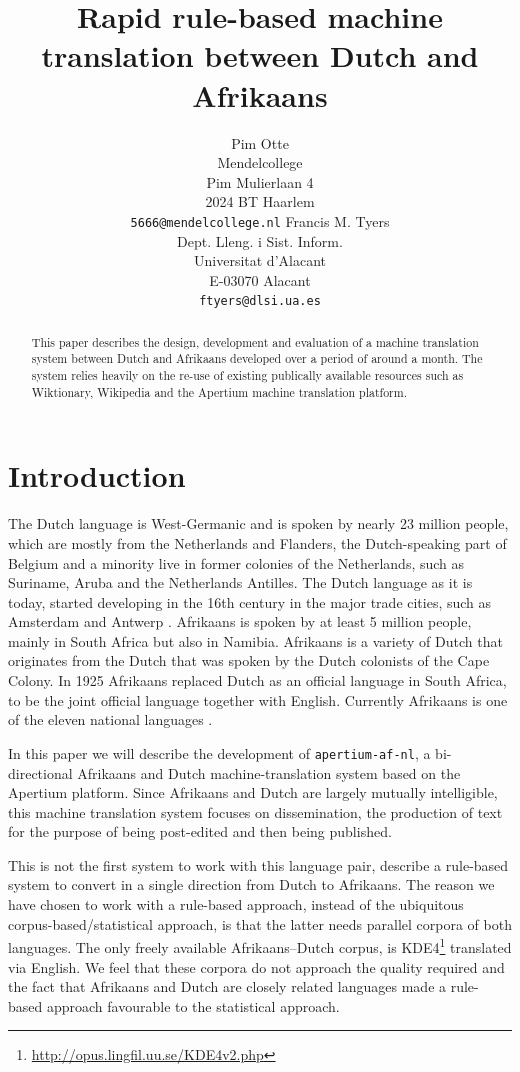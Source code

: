 \documentclass[11pt]{article}
\title{Rapid rule-based machine translation between Dutch and Afrikaans}
\author{Pim Otte\\
  Mendelcollege\\
  Pim Mulierlaan 4\\
  2024 BT Haarlem\\
  {\tt 5666@mendelcollege.nl}  \And
  Francis M. Tyers\\
  Dept. Lleng. i Sist. Inform.\\
  Universitat d'Alacant\\
  E-03070 Alacant \\
  {\tt ftyers@dlsi.ua.es}}
\date{}
\begin{document}
\maketitle
\begin{abstract}
 This paper describes the design, development and evaluation of a machine
 translation system between Dutch and Afrikaans developed over a period of
 around a month. The system relies heavily on the re-use of existing 
 publically available resources such as Wiktionary, Wikipedia and the 
 Apertium machine translation platform.
\end{abstract}

\section{Introduction}

The Dutch language is West-Germanic and is spoken by nearly 23 million people, which are 
mostly from the Netherlands and Flanders, the Dutch-speaking part of Belgium and a minority 
live in former colonies of the Netherlands, such as Suriname, Aruba and the Netherlands 
Antilles. The Dutch language as it is today, started developing in the 16th century in the 
major trade cities, such as Amsterdam and Antwerp \cite{Shetter:02}.  Afrikaans is spoken 
by at least 5 million people, mainly in South Africa but also in Namibia. Afrikaans is a 
variety of Dutch that originates from the Dutch that was spoken by the Dutch colonists of 
the Cape Colony. In 1925 Afrikaans replaced Dutch as an official language in South Africa, to 
be the joint official language together with English. Currently Afrikaans is one of the 
eleven national languages \cite{Donaldson:93}.

In this paper we will describe the development of {\small {\tt apertium-af-nl}}, a bi-directional Afrikaans 
and Dutch machine-translation system based on the Apertium platform. Since Afrikaans and Dutch 
are largely mutually intelligible, this machine translation system focuses on dissemination, the 
production of text for the purpose of being post-edited and then being published. 

This is not the first system to work with this language pair,  describe
a rule-based system to convert in a single direction from Dutch to Afrikaans. 
The reason we have chosen to work with a rule-based approach, instead of the ubiquitous 
corpus-based/statistical approach, is that the latter needs parallel corpora of both 
languages. The only freely available Afrikaans--Dutch corpus, is 
KDE4\footnote{\url{http://opus.lingfil.uu.se/KDE4v2.php}} translated via English. We 
feel that these corpora do not approach the quality required and the fact that Afrikaans 
and Dutch are closely related languages made a rule-based approach favourable to the 
statistical approach.
\end{document}
